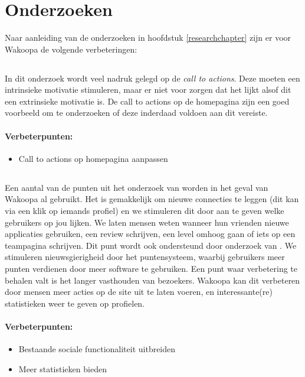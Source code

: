 \documentclass[a4paper, 10pt, pdftex]{report}
\begin{document}
    \section{Onderzoeken}
    Naar aanleiding van de onderzoeken in hoofdstuk \ref{researchchapter} zijn er voor Wakoopa de volgende verbeteringen:

 \subsection{\cite{Beenen2004}}
      In dit onderzoek wordt veel nadruk gelegd op de \emph{call to actions}. Deze moeten een intrinsieke motivatie stimuleren, maar er niet voor zorgen dat het lijkt alsof dit een extrinsieke motivatie is. De call to actions op de homepagina zijn een goed voorbeeld om te onderzoeken of deze inderdaad voldoen aan dit vereiste.

      \paragraph{\textbf{Verbeterpunten:}}
      \begin{itemize}
        \item Call to actions op homepagina aanpassen
      \end{itemize}

    \subsection{\cite{Berlanga2007}}
    Een aantal van de punten uit het onderzoek van \citeauthor{Berlanga2007} worden in het geval van Wakoopa al gebruikt. Het is gemakkelijk om nieuwe connecties te leggen (dit kan via een klik op iemands profiel) en we stimuleren dit door aan te geven welke gebruikers op jou lijken. We laten mensen weten wanneer hun vrienden nieuwe applicaties gebruiken, een review schrijven, een level omhoog gaan of iets op een teampagina schrijven. Dit punt wordt ook ondersteund door onderzoek van \cite{Berlanga2007}. We stimuleren nieuwsgierigheid door het puntensysteem, waarbij gebruikers meer punten verdienen door meer software te gebruiken. Een punt waar verbetering te behalen valt is het langer vasthouden van bezoekers. Wakoopa kan dit verbeteren door mensen meer acties op de site uit te laten voeren, en interessante(re) statistieken weer te geven op profielen.

      \paragraph{\textbf{Verbeterpunten:}}
      \begin{itemize}
        \item Bestaande sociale functionaliteit uitbreiden
        \item Meer statistieken bieden
      \end{itemize}
\end{document}
